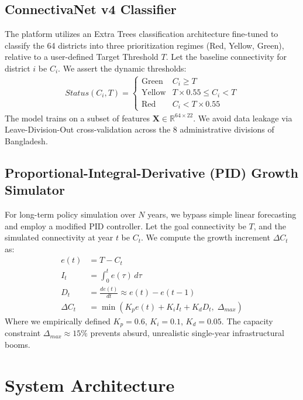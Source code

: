 \documentclass[11pt,a4paper]{article}
\begin{document}
\subsection{ConnectivaNet v4 Classifier}
The platform utilizes an Extra Trees classification architecture fine-tuned to classify the 64 districts into three prioritization regimes (Red, Yellow, Green), relative to a user-defined Target Threshold $T$. Let the baseline connectivity for district $i$ be $C_i$. We assert the dynamic thresholds:
\begin{align}
    Status(C_i, T) = \begin{cases} 
      \text{Green} & C_i \geq T \\
      \text{Yellow} & T \times 0.55 \leq C_i < T \\
      \text{Red} & C_i < T \times 0.55
   \end{cases}
\end{align}
The model trains on a subset of features $\mathbf{X} \in \mathbb{R}^{64 \times 22}$. We avoid data leakage via Leave-Division-Out cross-validation across the 8 administrative divisions of Bangladesh.

\subsection{Proportional-Integral-Derivative (PID) Growth Simulator}
For long-term policy simulation over $N$ years, we bypass simple linear forecasting and employ a modified PID controller. Let the goal connectivity be $T$, and the simulated connectivity at year $t$ be $C_t$. We compute the growth increment $\Delta C_t$ as:
\begin{align}
    e(t) &= T - C_t \\
    I_t &= \int_{0}^{t} e(\tau) \,d\tau \\
    D_t &= \frac{de(t)}{dt} \approx e(t) - e(t-1) \\
    \Delta C_t &= \min\left( K_p e(t) + K_i I_t + K_d D_t, \; \Delta_{max} \right)
\end{align}
Where we empirically defined $K_p = 0.6$, $K_i = 0.1$, $K_d = 0.05$. The capacity constraint $\Delta_{max} \approx 15\%$ prevents absurd, unrealistic single-year infrastructural booms.

\section{System Architecture}
\end{document}
